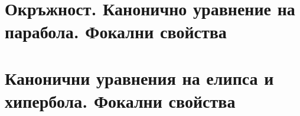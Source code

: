 
\section{Окръжност. Канонично уравнение на парабола. Фокални свойства}
\section{Канонични уравнения на елипса и хипербола. Фокални свойства}